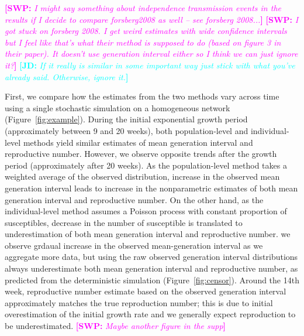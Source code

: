 \documentclass[12pt]{article}
\newcommand{\comment}[3]{\textcolor{#1}{\textbf{[#2: }\textsl{#3}\textbf{]}}}
\newcommand{\jd}[1]{\comment{cyan}{JD}{#1}}
\newcommand{\swp}[1]{\comment{magenta}{SWP}{#1}}
\begin{document}
\swp{I might say something about independence transmission events in the results if I decide to compare forsberg2008 as well -- see forsberg 2008...}
\swp{I got stuck on forsberg 2008. I get weird estimates with wide confidence intervals but I feel like that's what their method is supposed to do (based on figure 3 in their paper). It doesn't use generation interval either so I think we can just ignore it?}
\jd{If it really is similar in some important way just stick with what you've already said. Otherwise, ignore it.}

First, we compare how the estimates from the two methods vary across time using a single stochastic simulation on a homogeneous network (Figure~\ref{fig:example}).
During the initial exponential growth period (approximately between 9 and 20 weeks), both population-level and individual-level methods yield similar estimates of mean generation interval and reproductive number.
However, we observe opposite trends after the growth period (approximately after 20 weeks).
As the population-level method takes a weighted average of the observed distribution, increase in the observed mean generation interval leads to increase in the nonparametric estimates of both mean generation interval and reproductive number.
On the other hand, as the individual-level method assumes a Poisson process with constant proportion of susceptibles, decrease in the number of susceptible is translated to underestimation of both mean generation interval and reproductive number.
we observe grdaual increase in the observed mean-generation interval as we aggregate more data, but using the raw observed generation interval distributions always underestimate both mean generation interval and reproductive number, as predicted from the deterministic simulation (Figure~\ref{fig:censor}).
Around the 14th week, reproductive number estimate based on the observed generation interval approximately matches the true reproduction number; this is due to initial overestimation of the initial growth rate and we generally expect reproduction to be underestimated. \swp{Maybe another figure in the supp}
\end{document}
